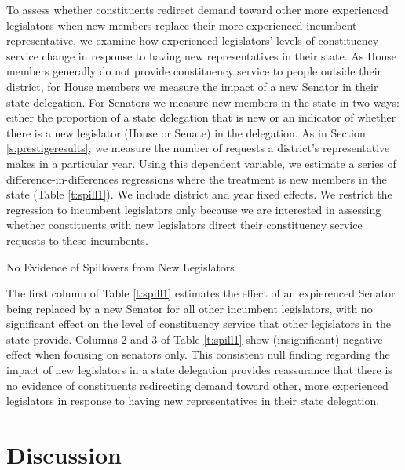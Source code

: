 \documentclass[12pt]{article}
\begin{document}
To assess whether constituents redirect demand toward other more experienced legislators when new members replace their more experienced incumbent representative, we examine how experienced legislators' levels of constituency service change in response to having new representatives in their state. As House members generally do not provide constituency service to people outside their district, for House members we measure the impact of a new Senator in their state delegation. For Senators we measure new members in the state in two ways: either the proportion of a state delegation that is new or an indicator of whether there is a new legislator (House or Senate) in the delegation. As in Section \ref{s:prestigeresults}, we measure the number of requests a district's representative makes in a particular year. Using this dependent variable, we estimate a series of difference-in-differences regressions where the treatment is new members in the state (Table \ref{t:spill1}). We include district and year fixed effects. We restrict the regression to incumbent legislators only because we are interested in assessing whether constituents with new legislators direct their constituency service requests to these incumbents. 
   
\begin{table}[hbt!]
\caption{No Evidence of Spillovers from New Legislators} \label{t:spill1}

\begin{minipage}{\textwidth}
\begin{center}

\end{center}
\end{minipage}
\end{table}

The first column of Table \ref{t:spill1} estimates the effect of an expierenced Senator being replaced by a new Senator for all other incumbent legislators, with no significant effect on the level of constituency service that other legislators in the state provide. Columns 2 and 3 of Table \ref{t:spill1} show (insignificant) negative effect when focusing on senators only. This consistent null finding regarding the impact of new legislators in a state delegation provides reassurance that there is no evidence of constituents redirecting demand toward other, more experienced legislators in response to having new representatives in their state delegation.




\section{Discussion} \label{s:discussion}
\end{document}
